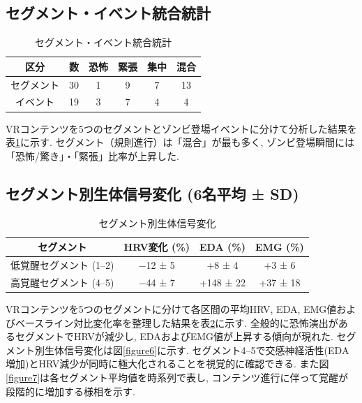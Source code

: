 \documentclass[a4paper]{jarticle}
\begin{document}
\subsection{セグメント・イベント統合統計}
\begin{table}[tb]
\caption{セグメント・イベント統合統計}
\label{table1}
\begin{center}\footnotesize
\def\arraystretch{1.1}
\begin{tabular}{|c|c|c|c|c|c|}\hline 
区分 & 数 & 恐怖 & 緊張 & 集中 & 混合 \\ \hline
セグメント & 30 & 1 & 9 & 7 & 13 \\ \hline
イベント & 19 & 3 & 7 & 4 & 4 \\ \hline
\end{tabular}
\end{center}
\vspace*{-3mm}
\end{table}

VRコンテンツを5つのセグメントとゾンビ登場イベントに分けて分析した結果を表\ref{table1}に示す.
セグメント（規則進行）は「混合」が最も多く, ゾンビ登場瞬間には「恐怖/驚き」・「緊張」比率が上昇した.

\subsection{セグメント別生体信号変化 (6名平均 ± SD)}

\setlength{\tabcolsep}{2pt}
\begin{table}[tb]
\begin{center}
\caption{セグメント別生体信号変化}
\label{table2}
\scriptsize
\begin{tabular}{|c|c|c|c|}\hline
\textbf{セグメント} & \textbf{HRV変化 (\%)} & \textbf{EDA (\%)} & \textbf{EMG (\%)} \\
\hline
低覚醒セグメント (1–2) & −12 ± 5 & +8 ± 4 & +3 ± 6 \\
\hline
高覚醒セグメント (4–5) & −44 ± 7 & +148 ± 22 & +37 ± 18 \\
\hline
\end{tabular}
\vspace*{-3mm}
\end{center}
\end{table}


VRコンテンツを5つのセグメントに分けて各区間の平均HRV, EDA, EMG値およびベースライン対比変化率を整理した結果を表\ref{table2}に示す. 全般的に恐怖演出があるセグメントでHRVが減少し, EDAおよびEMG値が上昇する傾向が現れた. セグメント別生体信号変化は図\ref{figure6}に示す. セグメント4–5で交感神経活性(EDA増加)とHRV減少が同時に極大化されることを視覚的に確認できる. また図\ref{figure7}は各セグメント平均値を時系列で表し, コンテンツ進行に伴って覚醒が段階的に増加する様相を示す. 
\end{document}
